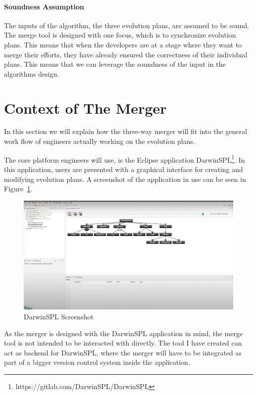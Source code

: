 \documentclass[a4paper,english]{ifimaster}
\begin{document}
\paragraph{Soundness Assumption}%
\label{par:soundness_assumption}

The inputs of the algorithm, the three evolution plans, are assumed to be sound. The merge tool is designed with one focus, which is to synchronize evolution plans. This means that when the developers are at a stage where they want to merge their efforts, they have already ensured the correctness of their individual plans. This means that we can leverage the soundness of the input in the algorithms design. 

\section{Context of The Merger}%
\label{sec:context_of_the_merger}

In this section we will explain how the three-way merger will fit into the general work flow of engineers actually working on the evolution plans.

The core platform engineers will use, is the Eclipse application DarwinSPL\footnote{https://gitlab.com/DarwinSPL/DarwinSPL}. In this application, users are presented with a graphical interface for creating and modifying evolution plans. A screenshot of the application in use can be seen in Figure~\ref{fig:darwin_spl_screenshot}. 

\begin{figure}[htpb]
  \centering
  \includegraphics[width=\linewidth]{darwin_spl_screenshot.png}
  \caption{DarwinSPL Screenshot}%
  \label{fig:darwin_spl_screenshot}
\end{figure}

As the merger is designed with the DarwinSPL application in mind, the merge tool is not intended to be interacted with directly. The tool I have created can act as backend for DarwinSPL, where the merger will have to be integrated as part of a bigger version control system inside the application.
\end{document}
